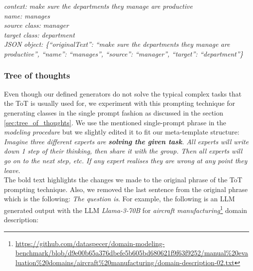 \noindent{}\textit{context: make sure the departments they manage are productive} \\
\textit{name: manages} \\
\textit{source class: manager} \\
\textit{target class: department} \\
\textit{JSON object: \{``originalText'': ``make sure the departments they manage are productive'', ``name'': ``manages'', ``source'': ``manager'', ``target'': ``department''\}}


\subsubsection{Tree of thoughts}

Even though our defined generators do not solve the typical complex tasks that the ToT is usually used for, we experiment with this prompting technique for generating classes in the single prompt fashion as discussed in the section \ref{sec:tree_of_thoughts}. We use the mentioned single-prompt phrase in the \emph{modeling procedure} but we slightly edited it to fit our meta-template structure: \\

\noindent{}\textit{Imagine three different experts are \textbf{solving the given task}. All experts will write down 1 step of their thinking, then share it with the group. Then all experts will go on to the next step, etc. If any expert realises they are wrong at any point they leave.} \\

\noindent{}The bold text highlights the changes we made to the original phrase of the ToT prompting technique. Also, we removed the last sentence from the original phrase which is the following: \textit{The question is}. For example, the following is an LLM generated output with the LLM \emph{Llama-3-70B} for \textit{aircraft manufacturing}\footnote{\url{https://github.com/dataspecer/domain-modeling-benchmark/blob/d9e00b65a376dbefe5b605bd680621f9f63f9252/manual\%20evaluation\%20domains/aircraft\%20manufacturing/domain-description-02.txt}} domain description: \\


